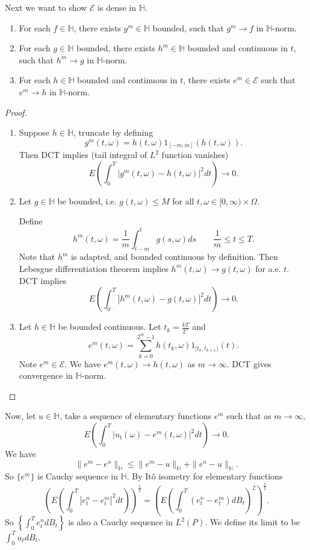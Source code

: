 Next we want to show $\mathcal{E}$ is dense in $\mathbb{H}$.
\begin{enumerate}
	\item For each $f \in \mathbb{H}$, there exists $g^m \in \mathbb{H}$ bounded, such that $g^m \to  f$ in $\mathbb{H}$-norm.
	\item For each $g \in \mathbb{H}$ bounded, there exists $h^m \in \mathbb{H}$ bounded and continuous in $t$, such that $h^m \to  g$ in $\mathbb{H}$-norm.
	\item For each $h \in \mathbb{H}$ bounded and continuous in $t$, there exists $e^m \in \mathcal{E}$ such that $e^m \to  h$ in $\mathbb{H}$-norm.
\end{enumerate}
\begin{proof}
	\begin{enumerate}
		\item Suppose $h \in \mathbb{H}$, truncate by defining
			\[
				g^m(t, \omega) = h(t, \omega) 1_{[-m, m]}\left( h(t, \omega) \right) 
			.\] 
			Then DCT implies (tail integral of  $L^2$ function vanishes)
			\[
				E\left( \int _0^T \left| g^m(t, \omega) - h(t, \omega) \right|^2 dt  \right) \to  0
			.\] 
		\item Let $g \in \mathbb{H}$ be bounded, i.e. $g(t, \omega) \le  M$ for all $t, \omega \in [0,\infty  ) \times \Omega$.

			Define 
			\[
				h^m(t, \omega) = \frac{1}{m} \int _{t - m}^t g(s, \omega) ds \qquad \frac{1}{m} \le  t \le T
			.\] 
			Note that $h^m $ is adapted, and bounded continuous by definition. Then Lebesgue differentiation theorem implies $h^m(t, \omega) \to g(t, \omega)$  for a.e. $t$. DCT implies
			\[
				E\left( \int _0^T \left| h^m(t, \omega) - g(t, \omega) \right|^2 dt  \right)  \to 0
			.\] 
		\item Let $h \in \mathbb{H}$  be bounded continuous. Let $t_k = \frac{k T}{2^n}$ and
			\[
				e^m(t, \omega) = 
				\sum_{k=0}^{2^m - 1} h(t_k, \omega) 1_{[t_k, t_{k+1})} (t)
			.\] 
			Note $e^m \in \mathcal{E}$. We have  $e^m(t, \omega) \to h(t, \omega)$ as $m \to  \infty $. DCT gives convergence in $\mathbb{H}$-norm.

	\end{enumerate}
\end{proof}

\textbf{}
Now, let $u \in \mathbb{H}$, take a sequence of elementary functions $e^m$  such that as $m \to \infty $,
\[
	E\left( \int _0^T \left| u_t(\omega) - e^m(t, \omega) \right| ^2 dt  \right) \to 0
.\] 
We have
\[
	\|e^m - e^n\|_{\mathbb{H}} \le  \|e^m - u\|_{\mathbb{H}} + \|e^n - u\|_{\mathbb{H}}
.\] 
So $\{e^m\}$ is Cauchy sequence in $\mathbb{H}$. By Itô isometry for elementary functions
\[
	\left( E\left( \int _0^T \left| e^n_t - e^m_t \right| ^2 dt  \right)  \right) ^{\frac{1}{2}} 
	= \left( E\left( \int _0^T \left( e_t^n - e_t^m \right) d B_t  \right) ^2 \right) ^{\frac{1}{2}}
.\] 
So $\left\{ \int _0^T e^n_t dB_t \right\} $ is also a Cauchy sequence in $L^2(P)$. We define its limit to be $\int _0^T u_t dB_t$.

